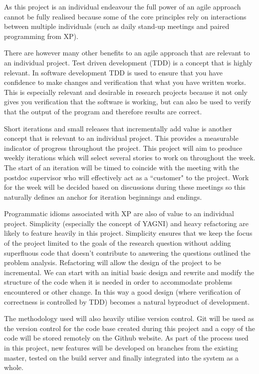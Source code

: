 As this project is an individual endeavour the full power of an agile approach cannot be fully realised because some of the core principles rely on interactions between multiple individuals (such as daily stand-up meetings and paired programming from XP).

There are however many other benefits to an agile approach that are relevant to an individual project. Test driven development (TDD) is a concept that is highly relevant. In software development TDD is used to ensure that you have confidence to make changes and verification that what you have written works. This is especially relevant and desirable in research projects because it not only gives you verification that the software is working, but can also be used to verify that the output of the program and therefore results are correct.

Short iterations and small releases that incrementally add value is another concept that is relevant to an individual project. This provides a measurable indicator of progress throughout the project. This project will aim to produce weekly iterations which will select several stories to work on throughout the week. The start of an iteration will be timed to coincide with the meeting with the postdoc supervisor who will effectively act as a ``customer" to the project. Work for the week will be decided based on discussions during these meetings so this naturally defines an anchor for iteration beginnings and endings.

Programmatic idioms associated with XP are also of value to an individual project. Simplicity (especially the concept of YAGNI) and heavy refactoring are likely to feature heavily in this project. Simplicity ensures that we keep the focus of the project limited to the goals of the research question without adding superfluous code that doesn't contribute to answering the questions outlined the problem analysis. Refactoring will allow the design of the project to be incremental. We can start with an initial basic design and rewrite and modify the structure of the code when it is needed in order to accommodate problems encountered or other change. In this way a good design (where verification of correctness is controlled by TDD) becomes a natural byproduct of development.

The methodology used will also heavily utilise version control. Git will be used as the version control for the code base created during this project and a copy of the code will be stored remotely on the Github website. As part of the process used in this project, new features will be developed on branches from the existing master, tested on the build server and finally integrated into the system as a whole.


